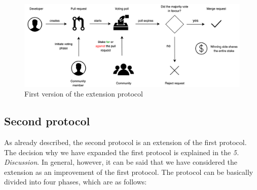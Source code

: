 \documentclass[sigconf]{acmart}
\begin{document}
\begin{figure}[h]
	\centering
	\includegraphics[width=140mm]{images/firstprotocol.png}
	\caption{First version of the extension protocol}
	\label{fig:arch-firstprotocol}
\end{figure}

\subsection{Second protocol}
As already described, the second protocol is an extension of the first protocol. The decision why we have expanded the first 
protocol is explained in the \textit{5. Discussion}. In general, however, it can be said that we have considered the extension as an 
improvement of the first protocol. The protocol can be basically divided into four phases, which are as follows: \\
\end{document}
